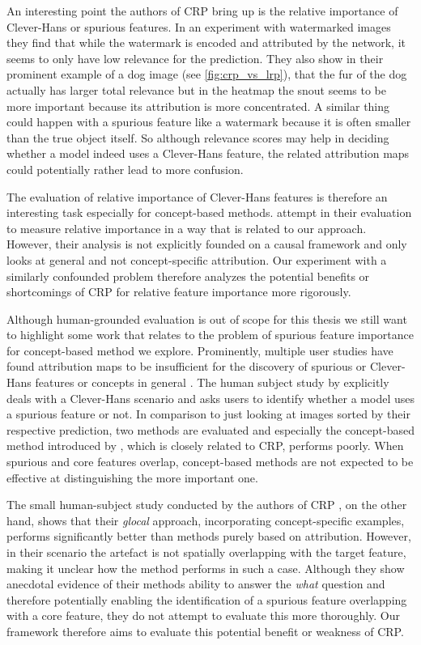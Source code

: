 An interesting point the authors of CRP bring up is the relative importance of Clever-Hans or spurious features. In an experiment with watermarked images they find that while the watermark is encoded and attributed by the network, it seems to only have low relevance for the prediction. They also show in their prominent example of a dog image (see \cref{fig:crp_vs_lrp}), that the fur of the dog actually has larger total relevance but in the heatmap the snout seems to be more important because its attribution is more concentrated. A similar thing could happen with a spurious feature like a watermark because it is often smaller than the true object itself. So although relevance scores may help in deciding whether a model indeed uses a Clever-Hans feature, the related attribution maps could potentially rather lead to more confusion.

The evaluation of relative importance of Clever-Hans features is therefore an interesting task especially for concept-based methods. \cite{Yang2019} attempt in their evaluation to measure relative importance in a way that is related to our approach. However, their analysis is not explicitly founded on a causal framework and only looks at general and not concept-specific attribution. 
Our experiment with a similarly confounded problem therefore analyzes the potential benefits or shortcomings of CRP for relative feature importance more rigorously. 

Although human-grounded evaluation is out of scope for this thesis we still want to highlight some work that relates to the problem of spurious feature importance for concept-based method we explore. 
Prominently, multiple user studies have found attribution maps to be insufficient for the discovery of spurious or Clever-Hans features or concepts in general \citep{Sixt2022a,Rong2023,Kim2018}. 
The human subject study by \cite{Sixt2022a} explicitly deals with a Clever-Hans scenario and asks users to identify whether a model uses a spurious feature or not. In comparison to just looking at images sorted by their respective prediction, two methods are evaluated and especially the concept-based method introduced by \cite{Zhang2021}, which is closely related to CRP, performs poorly. When spurious and core features overlap, concept-based methods are not expected to be effective at distinguishing the more important one. 

The small human-subject study conducted by the authors of CRP \citep{Achtibat2023}, on the other hand, shows that their \textit{glocal} approach, incorporating concept-specific examples, performs significantly better than methods purely based on attribution. However, in their scenario the artefact is not spatially overlapping with the target feature, making it unclear how the method performs in such a case. Although they show anecdotal evidence of their methods ability to answer the \textit{what} question and therefore potentially enabling the identification of a spurious feature overlapping with a core feature, they do not attempt to evaluate this more thoroughly. Our framework therefore aims to evaluate this potential benefit or weakness of CRP. 

